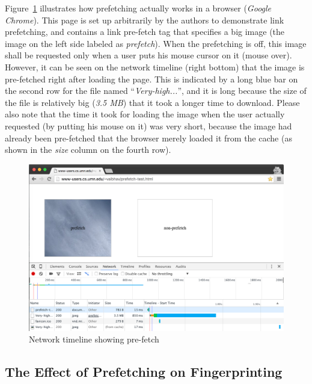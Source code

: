 Figure~\ref{fig:network} illustrates how prefetching actually works in a browser ({\it Google Chrome}).
This page is set up arbitrarily by the authors to demonstrate link prefetching, and contains a link pre-fetch tag that specifies a big image (the image on the left side labeled as {\it prefetch}).
When the prefetching is off, this image shall be requested only when a user puts his mouse cursor on it (mouse over).
However, it can be seen on the network timeline (right bottom) that the image is pre-fetched right after loading the page.
This is indicated by a long blue bar on the second row for the file named ``{\it Very-high...}'', and it is long because the size of the file is relatively big ({\it 3.5 MB}) that it took a longer time to download.
Please also note that the time it took for loading the image when the user actually requested (by putting his mouse on it) was very short, because the image had already been pre-fetched that the browser merely loaded it from the cache (as shown in the {\it size} column on the fourth row).

\begin{figure}[t]
\includegraphics[width=\textwidth]{figures/prefetch-network.png}
\centering
\caption{Network timeline showing pre-fetch}
\label{fig:network}
\end{figure}

\subsection{The Effect of Prefetching on Fingerprinting}

